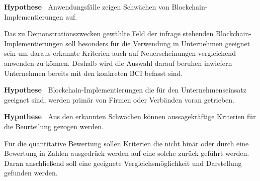 \textbf{Hypothese~} Anwendungsfälle zeigen Schwächen von Blockchain-Implementierungen auf.

Das zu Demonstrationszwecken gewählte Feld der infrage stehenden Blockchain-Implementierungen soll besonders für die Verwendung in Unternehmen geeignet sein um daraus erkannte Kriterien auch auf Neuerscheinungen vergleichend anwenden zu können. Deshalb wird die Auswahl darauf beruhen inwiefern Unternehmen bereits mit den konkreten \gls{BCI} befasst sind.

\textbf{Hypothese~} Blockchain-Implementierungen die für den Unternehmenseinsatz geeignet sind, werden primär von Firmen oder Verbänden voran getrieben.

\textbf{Hypothese~} Aus den erkannten Schwächen können aussagekräftige Kriterien für die Beurteilung gezogen werden.

Für die quantitative Bewertung sollen Kriterien die nicht binär oder durch eine Bewertung in Zahlen ausgedrück werden auf eine solche zurück geführt werden.
Daran anschließend soll eine geeignete Vergleichsmöglichkeit und Darstellung gefunden werden.



%

%

%





